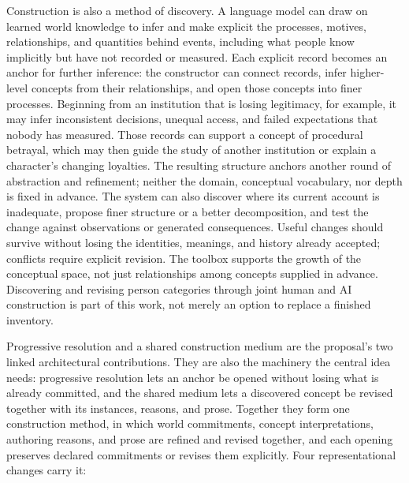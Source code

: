 \documentclass[11pt,a4paper]{article}
\begin{document}
Construction is also a method of discovery. A language model can draw on
learned world knowledge to infer and make explicit the processes,
motives, relationships, and quantities behind events, including what people
know implicitly but have not recorded or measured. Each explicit record becomes
an anchor for further inference: the constructor can connect records, infer
higher-level concepts from their relationships, and open those concepts into
finer processes. Beginning from an institution that is losing legitimacy, for
example, it may infer inconsistent decisions, unequal access, and failed
expectations that nobody has measured. Those records can support a concept of
procedural betrayal, which may then guide the study of another institution or
explain a character's changing loyalties. The resulting structure anchors
another round of abstraction and refinement; neither the domain, conceptual
vocabulary, nor depth is fixed in advance. The system can also discover where
its current account is inadequate, propose finer structure or a better
decomposition, and test the change against observations or generated
consequences. Useful changes should survive without losing the identities,
meanings, and history already accepted; conflicts require explicit revision.
The toolbox supports the growth of the conceptual space, not just
relationships among concepts supplied in advance. Discovering and revising
person categories through joint human and AI construction is part of this work,
not merely an option to replace a finished inventory.

Progressive resolution and a shared construction medium are the proposal's two
linked architectural contributions. They are also the machinery the central idea
needs:
progressive resolution lets an anchor be opened without losing what is already
committed, and the shared medium lets a discovered concept be revised together
with its instances, reasons, and prose. Together they form one construction method,
in which world commitments, concept interpretations, authoring reasons, and prose
are refined and revised together, and each opening preserves declared
commitments or revises them explicitly. Four representational changes carry it:
\end{document}
